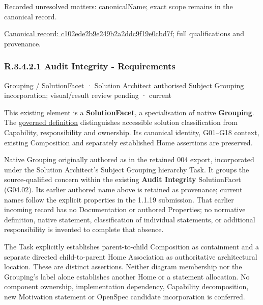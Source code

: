 {\small Recorded unresolved matters: canonicalName; exact scope remains in the canonical record.}\par
{\footnotesize \href{../../../../../../../continuum/grouping/c102ede2b9e249b2a2ddc9f19e0cbd7f.md}{Canonical record: c102ede2b9e249b2a2ddc9f19e0cbd7f}; full qualifications and provenance.}\par
\subsubsection*{R.3.4.2.1 Audit Integrity - Requirements}
\label{navigation:R.3.4.2.1}

\label{element:de3ff3302e504029b5b5f3f18fe9c380}
{\small Grouping / SolutionFacet · Solution Architect authorised Subject Grouping incorporation; visual/result review pending · current}\par

This existing element is a \textbf{SolutionFacet}, a specialisation of native
\textbf{Grouping}. The \href{\detokenize{../../../../../../../governance/continuum-representation.md#solutionfacet-classification--1119-candidate}}{governed definition}
distinguishes accessible solution classification from Capability, responsibility
and ownership. Its canonical identity, G01–G18 context, existing Composition
and separately established Home assertions are preserved.



Native Grouping originally authored as \texttt{} in the retained 004 export,
incorporated under the Solution Architect's Subject Grouping hierarchy Task.
It groups the source-qualified \texttt{} concern within
the existing \textbf{Audit Integrity} SolutionFacet (G04.02). Its earlier authored name above is retained as provenance; current names
follow the explicit properties in the 1.1.19 submission.
That earlier incoming record has no Documentation or authored Properties; no normative
definition, native statement, classification of individual statements, or
additional responsibility is invented to complete that absence.



The Task explicitly establishes parent-to-child Composition as containment and
a separate directed child-to-parent Home Association as authoritative architectural
location. These are distinct assertions. Neither diagram membership nor the
Grouping's label alone establishes another Home or a statement allocation.
No component ownership, implementation dependency, Capability decomposition,
new Motivation statement or OpenSpec candidate incorporation is conferred.



